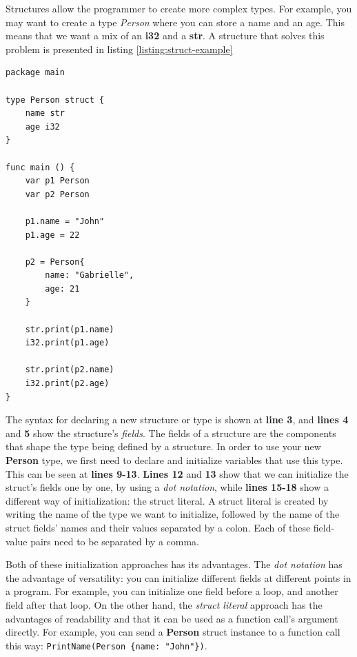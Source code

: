 \documentclass[11pt,fleqn,openany]{book} %
\begin{document}
Structures allow the programmer to create more complex types. For example, you may want to create a type \emph{Person} where you can store a name and an age. This means that we want a mix of an \textbf{i32} and a \textbf{str}. A structure that solves this problem is presented in listing \ref{listing:struct-example}

\begin{lstlisting}[caption={Type $Person$ using structures},captionpos=b,label={listing:struct-example}]
package main

type Person struct {
	name str
    age i32
}

func main () {
    var p1 Person
    var p2 Person
    
    p1.name = "John"
    p1.age = 22
    
    p2 = Person{
        name: "Gabrielle",
        age: 21
    }
    
    str.print(p1.name)
    i32.print(p1.age)
    
    str.print(p2.name)
    i32.print(p2.age)
}
\end{lstlisting}

The syntax for declaring a new structure or type is shown at \textbf{line 3}, and \textbf{lines 4} and \textbf{5} show the structure's \emph{fields}. The fields of a structure are the components that shape the type being defined by a structure. In order to use your new \textbf{Person} type, we first need to declare and initialize variables that use this type. This can be seen at \textbf{lines 9-13}. \textbf{Lines 12} and \textbf{13} show that we can initialize the struct's fields one by one, by using a \emph{dot notation}, while \textbf{lines 15-18} show a different way of initialization: the struct literal. A struct literal is created by writing the name of the type we want to initialize, followed by the name of the struct fields' names and their values separated by a colon. Each of these field-value pairs need to be separated by a comma.

Both of these initialization approaches has its advantages. The \emph{dot notation} has the advantage of versatility: you can initialize different fields at different points in a program. For example, you can initialize one field before a loop, and another field after that loop. On the other hand, the \emph{struct literal} approach has the advantages of readability and that it can be used as a function call's argument directly. For example, you can send a \textbf{Person} struct instance to a function call this way: \lstinline|PrintName(Person {name: "John"})|.
\end{document}
